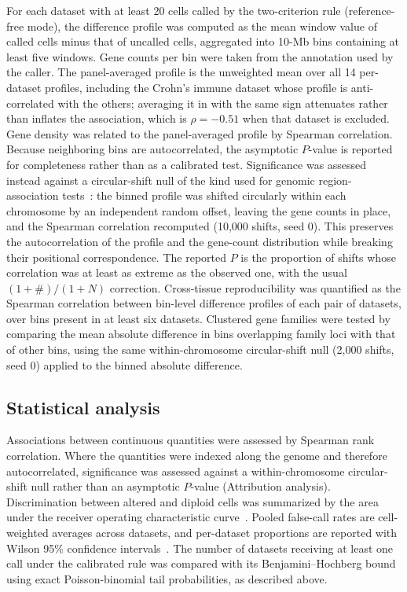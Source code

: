 \documentclass[11pt,letterpaper]{article}
\begin{document}
For each dataset with at least 20 cells called by the two-criterion rule (reference-free mode), the difference profile was computed as the mean window value of called cells minus that of uncalled cells, aggregated into 10-Mb bins containing at least five windows. Gene counts per bin were taken from the annotation used by the caller. The panel-averaged profile is the unweighted mean over all 14 per-dataset profiles, including the Crohn's immune dataset whose profile is anti-correlated with the others; averaging it in with the same sign attenuates rather than inflates the association, which is $\rho = -0.51$ when that dataset is excluded. Gene density was related to the panel-averaged profile by Spearman correlation. Because neighboring bins are autocorrelated, the asymptotic $P$-value is reported for completeness rather than as a calibrated test. Significance was assessed instead against a circular-shift null of the kind used for genomic region-association tests~\cite{gel2016}: the binned profile was shifted circularly within each chromosome by an independent random offset, leaving the gene counts in place, and the Spearman correlation recomputed (10{,}000 shifts, seed 0). This preserves the autocorrelation of the profile and the gene-count distribution while breaking their positional correspondence. The reported $P$ is the proportion of shifts whose correlation was at least as extreme as the observed one, with the usual $(1 + \#)/(1 + N)$ correction. Cross-tissue reproducibility was quantified as the Spearman correlation between bin-level difference profiles of each pair of datasets, over bins present in at least six datasets. Clustered gene families were tested by comparing the mean absolute difference in bins overlapping family loci with that of other bins, using the same within-chromosome circular-shift null (2{,}000 shifts, seed 0) applied to the binned absolute difference.

\subsection{Statistical analysis}

Associations between continuous quantities were assessed by Spearman rank correlation. Where the quantities were indexed along the genome and therefore autocorrelated, significance was assessed against a within-chromosome circular-shift null rather than an asymptotic $P$-value (Attribution analysis). Discrimination between altered and diploid cells was summarized by the area under the receiver operating characteristic curve~\cite{hanley1982}. Pooled false-call rates are cell-weighted averages across datasets, and per-dataset proportions are reported with Wilson 95\% confidence intervals~\cite{wilson1927}. The number of datasets receiving at least one call under the calibrated rule was compared with its Benjamini--Hochberg bound using exact Poisson-binomial tail probabilities, as described above.
\end{document}
